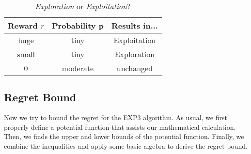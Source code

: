 \documentclass[11pt]{article}
\begin{document}
\begin{table}[h]
    \centering
    \begin{tabular}{c  c  c}
    \toprule
    \textbf{Reward} $r$        & \textbf{Probability} p & \textbf{Results in...} \\
    \midrule
    huge  & tiny & Exploitation\\
    small  & tiny & Exploration\\
    0 & moderate & unchanged\\
    \bottomrule
    \end{tabular}
    \caption{\textit{Exploration} or \textit{Exploitation}?}
    \label{tab:behavior}
\end{table}



\subsection{Regret Bound}

Now we try to bound the regret for the EXP3 algorithm. As usual, we first properly define a potential function that assists our mathematical calculation. Then, we finds the upper and lower bounds of the potential function. Finally, we combine the inequalities and apply some basic algebra to derive the regret bound.
\end{document}

